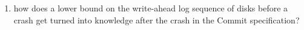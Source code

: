 \begin{enumerate}
  \item how does a lower bound on the write-ahead log sequence of disks before a
crash get turned into knowledge after the crash in the Commit specification?
\end{enumerate}

\resume
